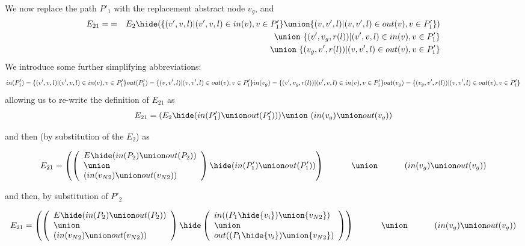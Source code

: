 We now replace the path $P'_1$ with the replacement abstract node $v_g$, and 
\begin{eqnarray*}
  E_{21} =  & = & E_2\hide (
                   \{(v',v,l)|(v',v,l) \in in(v), v\in P'_1\}
                   \union
                   \{(v,v',l)|(v,v',l) \in out(v), v\in P'_1\}
                  )\\
  && \union\ \{(v',v_g,r(l))|(v',v,l) \in in(v), v\in P'_1\}\\
  && \union\ \{(v_g,v',r(l))|(v,v',l) \in out(v), v\in P'_1\}
\end{eqnarray*}
We  introduce some further simplifying abbreviations:
\[
in(P'_1) = \{(v',v,l)|(v',v,l) \in in(v), v\in P'_1\}\\
out(P'_1) = \{(v,v',l)|(v,v',l) \in out(v), v\in P'_1\}\\
in(v_g) = \{(v',v_g,r(l))|(v',v,l) \in in(v), v\in P'_1\}\\
out(v_g) = \{(v_g,v',r(l))|(v,v',l) \in out(v), v\in P'_1\}\\
\]
\noindent
allowing us to re-write the definition of $E_{21}$ as
\[
  E_{21}  =  (E_2\hide ( in(P'_1) \union out(P'_1)))  \union\ (in(v_g) \union out(v_g))
\]
  

\noindent
and then (by substitution of the $E_2$) as


\[
E_{21}  =  \left( \left(
\begin{array}{l}  E\hide(in(P_2) \union out(P_2)) \\  \union \\ (in(v_{N2}) \union out(v_{N2}) ) \\
\end{array} \right)
   \hide ( in(P'_1) \union out(P'_1)) \right) \\
\hphantom{E_{12}  = \;\; }   \union\ \\
\hphantom{E_{12}  = \;\;}   (in(v_g) \union out(v_g))\\ 

\]

\noindent
and then, by substitution of $P'_2$

\[
E_{21}  =  \left( \left(
  \begin{array}{l}
    E\hide(in(P_2) \union out(P_2)) \\  \union \\ (in(v_{N2}) \union out(v_{N2}) ) \\
  \end{array} \right)
   \hide
   \left( \begin{array}{l}
     in((P_1\hide\{v_i\})\union\{v_{N2}\}) \\\union\\ out((P_1\hide\{v_i\})\union\{v_{N2}\})
   \end{array}
   \right) \right) \\
   \hphantom{E_{12}  = \;\; }   \union\ \\
\hphantom{E_{12}  = \;\;}   (in(v_g) \union out(v_g))\\ 
\]

